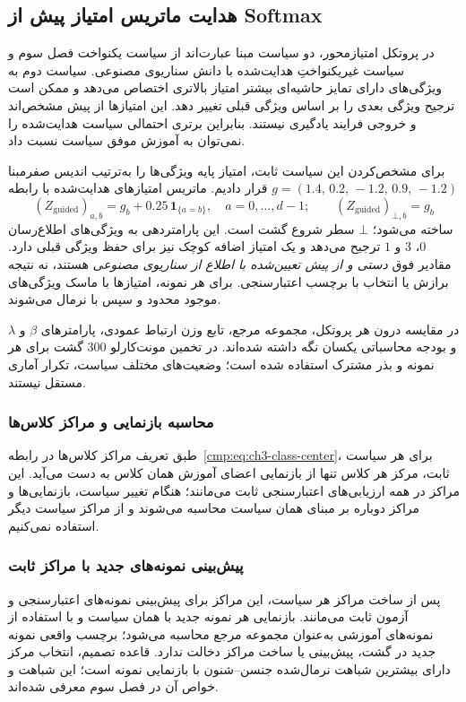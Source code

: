 \subsection{هدایت ماتریس امتیاز پیش از Softmax}
\label{subsec:ch4-policy-baselines}
در پروتکل امتیازمحور، دو سیاست مبنا عبارت‌اند از سیاست یکنواخت فصل سوم و سیاست غیریکنواختِ هدایت‌شده با دانش سناریوی مصنوعی. سیاست دوم به ویژگی‌های دارای تمایز حاشیه‌ای بیشتر امتیاز بالاتری اختصاص می‌دهد و ممکن است ترجیح ویژگی بعدی را بر اساس ویژگی قبلی تغییر دهد. این امتیازها از پیش مشخص‌اند و خروجی فرایند یادگیری نیستند. بنابراین برتری احتمالی سیاست هدایت‌شده را نمی‌توان به آموزش موفق سیاست نسبت داد.


برای مشخص‌کردن این سیاست ثابت، امتیاز پایه ویژگی‌ها
را به‌ترتیب اندیس صفرمبنا
$g=(1.4,\,0.2,\,-1.2,\,0.9,\,-1.2)$
قرار دادیم. ماتریس امتیازهای هدایت‌شده
با رابطه
\begin{equation}\label{eq:ch4-fixed-guided-logits}
(Z_{\mathrm{guided}})_{a,b}
=g_b+0.25\,\mathbf1_{\{a=b\}},
\quad a=0,\ldots,d-1;
\qquad
(Z_{\mathrm{guided}})_{\bot,b}=g_b
\end{equation}
ساخته می‌شود؛ $\bot$ سطر شروع گشت است.
این پارامتردهی به ویژگی‌های اطلاع‌رسان $0$، $3$ و $1$
ترجیح می‌دهد و یک امتیاز اضافه کوچک نیز برای
حفظ ویژگی قبلی دارد. مقادیر فوق \emph{دستی و از پیش
تعیین‌شده با اطلاع از سناریوی مصنوعی} هستند،
نه نتیجه برازش یا انتخاب با برچسب اعتبارسنجی.
برای هر نمونه، امتیازها با ماسک ویژگی‌های
موجود محدود و سپس با  نرمال می‌شوند.

در مقایسه درون هر پروتکل، مجموعه مرجع، تابع وزن ارتباط عمودی، پارامترهای $\beta$ و $\lambda$ و بودجه محاسباتی یکسان نگه داشته شده‌اند. در تخمین مونت‌کارلو $300$ گشت برای هر نمونه و بذر مشترک استفاده شده است؛ وضعیت‌های مختلف سیاست، تکرار آماری مستقل نیستند.

\subsubsection{محاسبه بازنمایی و مراکز کلاس‌ها}
\label{subsec:ch4-fixed-policy-representations}
طبق تعریف مراکز کلاس‌ها در
رابطه~\eqref{cmp:eq:ch3-class-center}،
برای هر سیاست ثابت، مرکز هر کلاس
تنها از بازنمایی اعضای آموزش همان کلاس
به دست می‌آید. این مراکز در همه
ارزیابی‌های اعتبارسنجی ثابت می‌مانند؛
هنگام تغییر سیاست، بازنمایی‌ها و
مراکز دوباره بر مبنای همان سیاست
محاسبه می‌شوند و از مراکز سیاست دیگر
استفاده نمی‌کنیم.

\subsubsection{پیش‌بینی نمونه‌های جدید با مراکز ثابت}
\label{sec:ch4-inference}
پس از ساخت مراکز هر سیاست، این مراکز برای پیش‌بینی نمونه‌های اعتبارسنجی و آزمون ثابت می‌مانند. بازنمایی هر نمونه جدید با همان سیاست و با استفاده از نمونه‌های آموزشی به‌عنوان مجموعه مرجع محاسبه می‌شود؛ برچسب واقعی نمونه جدید در گشت، پیش‌بینی یا ساخت مراکز دخالت ندارد. قاعده تصمیم، انتخاب مرکز دارای بیشترین شباهت نرمال‌شده جنسن--شنون با بازنمایی نمونه است؛ این شباهت و خواص آن در فصل سوم معرفی شده‌اند.

